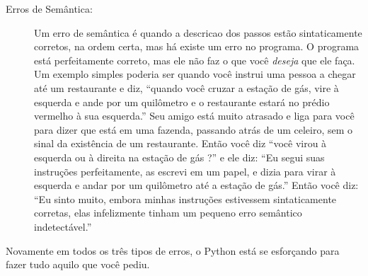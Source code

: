 \begin{description}
\item[Erros de Semântica:] Um erro de semântica é quando a descricao dos passos estão
sintaticamente corretos, na ordem certa, mas há existe um erro no programa. O programa
está perfeitamente correto, mas ele não faz o que você {\em deseja} que ele faça. Um
exemplo simples poderia ser quando você instrui uma pessoa a chegar até um restaurante
e diz, ``quando você cruzar a estação de gás, vire à esquerda e ande por um quilômetro e o
restaurante estará no prédio vermelho à sua esquerda.'' Seu amigo está muito atrasado
e liga para você para dizer que está em uma fazenda, passando atrás de um celeiro, sem o sinal
da existência de um restaurante. Então você diz ``você virou à esquerda ou à direita na
estação de gás ?'' e ele diz: ``Eu segui suas instruções perfeitamente, as escrevi em um papel,
e dizia para virar à esquerda e andar por um quilômetro até a estação de gás.'' Então
você diz: ``Eu sinto muito, embora minhas instruções estivessem sintaticamente corretas,
elas infelizmente tinham um pequeno erro semântico indetectável.''
%

\end{description}
%

Novamente em todos os três tipos de erros, o Python está se esforçando para 
fazer tudo aquilo que você pediu.
%


